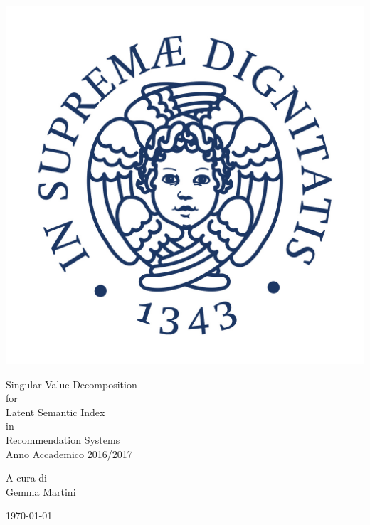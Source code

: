 \documentclass[12pt,a4paper]{article}
\theoremstyle{thm}
\theoremstyle{def}
\begin{document}
\begin{titlepage}
\begin{center}
\vspace{3cm}

\begin{center}
\includegraphics[scale=0.3]{Cherubino.jpg}
\end{center}

\vspace{1cm}
\Huge
{\sc Singular Value Decomposition}\\
for\\
{\sc Latent Semantic Index}\\
in\\
{\sc Recommendation Systems}\\
\Large
Anno Accademico 2016/2017\\

\vspace{1.5cm}

\Large
A cura di\\
{\sc Gemma Martini}\\

\vspace{1.5cm}

\today

\vfill

\end{center}
\end{titlepage}
\end{document}
